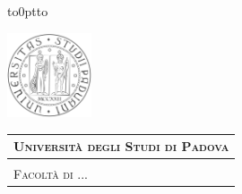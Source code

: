 \documentclass[a4paper, 12pt, twoside, openright]{book}
\begin{document}
\frontmatter
{}

\begin{titlepage} %
\begin{center}
\vbox to0pt{\vbox to\vss}

\hspace{0.5cm}
\begin{minipage}{.20\textwidth}
  \includegraphics[height=2.5cm]{images/unipd-bn.png}
\end{minipage}\begin{minipage}{.90\textwidth}
  \begin{table}[H]
  \begin{tabular}{l}
  \scshape{\Large{\bfseries{Università degli Studi di Padova}}} \\
  \hline \\
  \scshape{\Large{Facoltà di ...}} \\
  \end{tabular}
  \end{table}
\end{minipage}


\end{center}
\end{titlepage}
\end{document}
